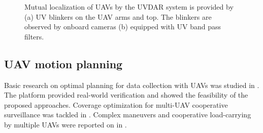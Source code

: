 \documentclass[a4paper,11pt,titlepage,twoside]{book}
\begin{document}
\begin{figure}
{}
    \hfill%
    \caption{Mutual localization of \acp{UAV} by the UVDAR system is provided by (a) \ac{UV} blinkers on the \ac{UAV} arms and top. The blinkers are observed by onboard cameras (b) equipped with \ac{UV} band pass filters.}
    \label{fig:uvdar}
  \end{figure}

  \subsection{UAV motion planning}

  Basic research on optimal planning for data collection with \acp{UAV} was studied in \cite{penicka2019data, penicka2017dubins, penicka2017neighborhoods, penicka2017reactive, faigl2017onsolution}.
  The platform provided real-world verification and showed the feasibility of the proposed approaches.
  Coverage optimization for multi-\ac{UAV} cooperative surveillance was tackled in \cite{petrlik2019coverage, faigl2019unsupervised}.
  Complex maneuvers and cooperative load-carrying by multiple \acp{UAV} were reported on in \cite{spurny2019transport, spurny2016complex}.
\end{document}
